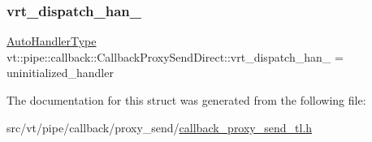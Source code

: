 \subsubsection{\texorpdfstring{vrt\+\_\+dispatch\+\_\+han\+\_\+}{vrt\_dispatch\_han\_}}
{\footnotesize\ttfamily \hyperlink{structvt_1_1pipe_1_1callback_1_1_callback_proxy_send_direct_adbd70e6c1d6b374083e5d0babdcab07e}{Auto\+Handler\+Type} vt\+::pipe\+::callback\+::\+Callback\+Proxy\+Send\+Direct\+::vrt\+\_\+dispatch\+\_\+han\+\_\+ = uninitialized\+\_\+handler\hspace{0.3cm}{\ttfamily [private]}}



The documentation for this struct was generated from the following file\+:\begin{DoxyCompactItemize}
\item 
src/vt/pipe/callback/proxy\+\_\+send/\hyperlink{callback__proxy__send__tl_8h}{callback\+\_\+proxy\+\_\+send\+\_\+tl.\+h}\end{DoxyCompactItemize}
